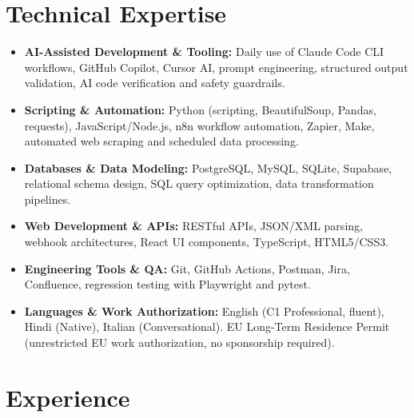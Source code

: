 \documentclass[10pt,a4paper]{article}
\begin{document}
\section{Technical Expertise}
\begin{itemize}
  \item \textbf{AI-Assisted Development \& Tooling:} Daily use of Claude Code CLI workflows, GitHub Copilot, Cursor AI, prompt engineering, structured output validation, AI code verification and safety guardrails.
  \item \textbf{Scripting \& Automation:} Python (scripting, BeautifulSoup, Pandas, requests), JavaScript/Node.js, n8n workflow automation, Zapier, Make, automated web scraping and scheduled data processing.
  \item \textbf{Databases \& Data Modeling:} PostgreSQL, MySQL, SQLite, Supabase, relational schema design, SQL query optimization, data transformation pipelines.
  \item \textbf{Web Development \& APIs:} RESTful APIs, JSON/XML parsing, webhook architectures, React UI components, TypeScript, HTML5/CSS3.
  \item \textbf{Engineering Tools \& QA:} Git, GitHub Actions, Postman, Jira, Confluence, regression testing with Playwright and pytest.
  \item \textbf{Languages \& Work Authorization:} English (C1 Professional, fluent), Hindi (Native), Italian (Conversational). EU Long-Term Residence Permit (unrestricted EU work authorization, no sponsorship required).
\end{itemize}

\section{Experience}
\end{document}
